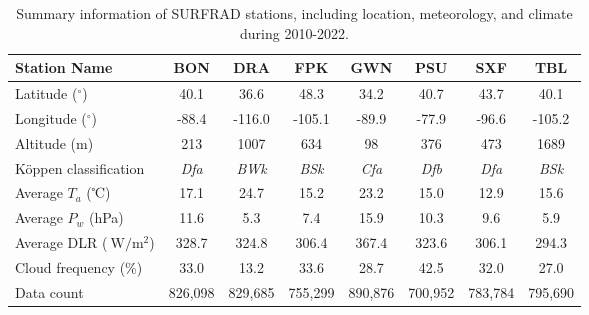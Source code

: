 \documentclass[preprint,12pt]{elsarticle}
\begin{document}
\begin{table}[htbp]
\centering
\caption{Summary information of SURFRAD stations, including location, meteorology, and climate during 2010-2022.}
\label{tab:station-data}
\small 
\begin{tabular}{lccccccc}
\toprule
Station Name                   & BON   & DRA    & FPK   & GWN    & PSU   & SXF   & TBL   \\ 
\midrule
Latitude ($^\circ$)            & 40.1  & 36.6   & 48.3  & 34.2   & 40.7  & 43.7  & 40.1  \\
Longitude ($^\circ$)           & -88.4 & -116.0 & -105.1 & -89.9 & -77.9 & -96.6 & -105.2\\
Altitude (m)                   & 213   & 1007   & 634   & 98     & 376   & 473   & 1689  \\
Köppen classification          & \textit{Dfa} & \textit{BWk} & \textit{BSk} & \textit{Cfa} & \textit{Dfb} & \textit{Dfa} & \textit{BSk} \\ 
Average $T_a$ (℃)          & 17.1  & 24.7   & 15.2  & 23.2   & 15.0  & 12.9  & 15.6  \\
Average $P_w$ (hPa)        & 11.6  & 5.3    & 7.4   & 15.9   & 10.3  & 9.6   & 5.9   \\
Average DLR ($\SI{}{\watt \per \meter^2}$)       & 328.7 & 324.8  & 306.4 & 367.4  & 323.6 & 306.1 & 294.3 \\
Cloud frequency (\%)           & 33.0  & 13.2   & 33.6  & 28.7   & 42.5  & 32.0  & 27.0  \\
Data count               & 826,098 & 829,685 & 755,299 & 890,876 & 700,952 & 783,784 & 795,690 \\
\bottomrule
\end{tabular}
\end{table}
\end{document}
